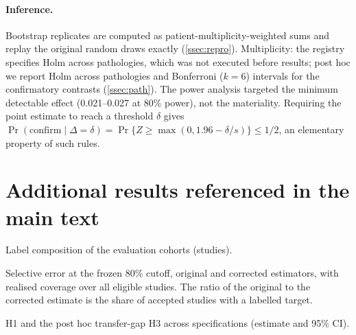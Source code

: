 \documentclass[10pt,a4paper]{article}
\begin{document}
\paragraph{Inference.}
Bootstrap replicates are computed as patient-multiplicity-weighted sums and
replay the original random draws exactly (\cref{ssec:repro}). Multiplicity:
the registry specifies Holm across pathologies, which was not executed before
results; post hoc we report Holm across pathologies and Bonferroni ($k=6$)
intervals for the confirmatory contrasts (\cref{ssec:path}). The power analysis
targeted the minimum detectable effect (0.021--0.027 at 80\% power), not the
materiality. Requiring the point estimate to reach a threshold $\delta$ gives
$\Pr(\text{confirm}\mid\Delta=\delta)=\Pr\{Z\ge\max(0,1.96-\delta/s)\}\le1/2$,
an elementary property of such rules.

\section{Additional results referenced in the main text}\label{ssec:extra}

\begin{table}[h]\centering\scriptsize
\caption{Label composition of the evaluation cohorts (studies).}\label{stab:labels}
\begin{adjustbox}{max width=\linewidth}\end{adjustbox}
\end{table}

\begin{table}[h]\centering\small
\caption{Selective error at the frozen 80\% cutoff, original and corrected
estimators, with realised coverage over all eligible studies. The ratio of
the original to the corrected estimate is the share of accepted studies with a
labelled target.}\label{stab:levels}
\begin{adjustbox}{max width=\linewidth}\end{adjustbox}
\end{table}

\begin{table}[h]\centering\scriptsize
\caption{H1 and the post hoc transfer-gap H3 across specifications (estimate and
95\% CI).}\label{stab:sens}
\begin{adjustbox}{max width=\linewidth}\end{adjustbox}
\end{table}
\end{document}
